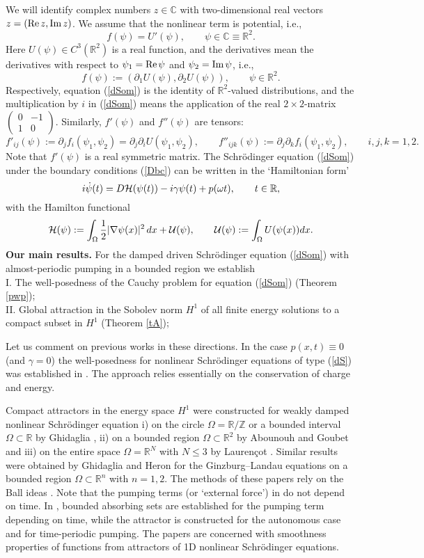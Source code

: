 \documentclass[11pt]{article}
\newcommand{\fr}{\frac}
\newcommand{\R}{{\mathbb R}}
\newcommand{\Z}{{\mathbb Z}}
\newcommand{\Co}{{\mathbb C}}
\newcommand{\cH}{{\cal H}}
\newcommand{\cU}{{\cal U}}
\newcommand{\om}{\omega}
\newcommand{\ga}{\gamma}
\newcommand{\Om}{\Omega}
\newcommand{\na}{\nabla}
\newcommand{\pa}{\partial}
\newcommand{\rRe}{{\rm Re\5}}
\newcommand{\rIm}{{\rm Im\5}}
\newcommand{\5}{{\hspace{0.5mm}}}
\numberwithin{equation}{section}
\newcommand{\ci}{\cite}
\newcommand{\la}{\label}
\newcommand{\be}{\begin{equation}}
\newcommand{\ee}{\end{equation}}
\newcommand{\ba}{\begin{array}}
\newcommand{\ea}{\end{array}}
\numberwithin{equation}{section}
\begin{document}
We will identify complex numbers $z\in\Co$ with two-dimensional real vectors $z=(\rRe z,\rIm z)$.
We assume that the nonlinear term is potential, i.e.,
\be\la{fU}
f(\psi)=U'(\psi),\qquad \psi\in\Co\equiv\R^2.
\ee
Here
$U(\psi)\in C^3(\R^2)$ is a real function, and the derivatives mean the derivatives with respect to $\psi_1=\rRe\psi$ and $\psi_2=\rIm\psi$, i.e.,
\be\la{fU2}
f(\psi):= (\pa_1U(\psi), \pa_2U(\psi)),\qquad\psi\in\R^2.
\ee
Respectively, equation (\ref{dSom}) is the identity of $\R^2$-valued distributions,
and the multiplication by $i$ in (\ref{dSom}) means the application of the real
$2\times 2$-matrix
$\left(\ba{rr}0&-1\\1&0\ea\right)$.
Similarly, $f'(\psi)$ and $f''(\psi)$ are tensors:
\be\la{fpr}
f'_{ij}(\psi):=\pa_jf_i(\psi_1,\psi_2)=\pa_j\pa_i U(\psi_1,\psi_2), \qquad f''_{ijk}(\psi):=\pa_j\pa_k f_i(\psi_1,\psi_2),\qquad i,j,k=1,2.
\ee
Note that $f'(\psi)$ is a real symmetric matrix.
The Schr\"odinger equation (\ref{dSom}) under the boundary conditions (\ref{Dbc}) can be written in the `Hamiltonian form'
\be\la{dSHf}
i\dot\psi(t)=D\cH(\psi(t))-i\ga\psi(t)+p(\om t),\qquad t\in\R,
\ee
with the Hamilton functional 
\be\la{Ham}
\cH(\psi):=\int_\Om \fr12|\na\psi(x)|^2\,dx+\cU(\psi),\qquad
\cU(\psi):=\int_\Om U(\psi(x))dx.
\ee
{\bf Our main results.}
For the damped driven Schr\"odinger equation (\ref{dSom}) with almost-periodic pumping in a bounded region
we establish
\medskip\\
I. The well-posedness of the Cauchy problem for equation (\ref{dSom}) (Theorem \ref{pwp});
\\
II. Global attraction in the Sobolev norm $H^1$
of all finite energy solutions to
a compact subset in $H^1$ (Theorem \ref{tA});
\medskip

Let us comment on previous works in these directions. In the case $p(x,t)\equiv 0$ (and $\ga=0$)
the well-posedness for nonlinear Schr\"odinger equations of type (\ref{dS}) was established in \ci{C2003}.
The approach \ci{C2003} relies essentially on the conservation of charge and energy.
\smallskip

Compact attractors in the energy space $H^1$ were constructed
 for weakly damped nonlinear Schr\"odin\-ger equation i) on the circle $\Om=\R/\Z$ or a bounded interval $\Om\subset \R$ by Ghidaglia \ci{G1988},
 ii) on a bounded region $\Om\subset\R^2$ by Abounouh and Goubet \ci{A1993, AG2000}
and iii) on the entire space $\Om=\R^N$ with $N\le 3$ by Lauren\c{c}ot \ci{L1995}.
Similar results were obtained by Ghidaglia and Heron \ci{GH1987} for the Ginzburg--Landau equations on a bounded region $\Om\subset\R^n$ with $n=1,2$.
The methods of these papers rely on the Ball ideas \ci{B2004}.
Note that the pumping terms (or `external force') in \ci{A1993, AG2000, GH1987, L1995} do not depend on time.
In \ci{G1988}, bounded absorbing sets are established
for the
pumping term depending on time,
 while the attractor is constructed for the autonomous case and for time-periodic pumping.
The papers \ci{G1996,G1998,GM2009} are concerned with smoothness properties of functions from
attractors of 1D nonlinear Schr\"odinger equations.
\end{document}
